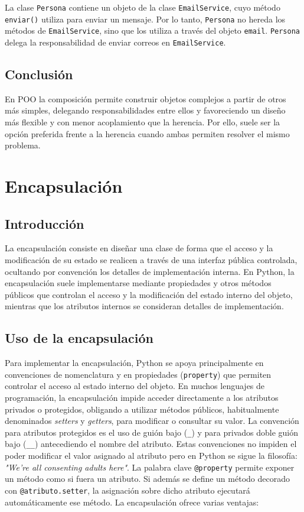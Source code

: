 \documentclass[11pt,a5paper,twoside]{book}
\begin{document}
La clase {\scriptsize \texttt{Persona}} contiene un objeto de la clase {\scriptsize \texttt{EmailService}}, cuyo método {\scriptsize \texttt{enviar()}} utiliza para enviar un mensaje. 
Por lo tanto, {\scriptsize \texttt{Persona}} no hereda los métodos de {\scriptsize \texttt{EmailService}}, sino que los utiliza a través del objeto {\scriptsize \texttt{email}}. {\scriptsize \texttt{Persona}} delega la responsabilidad de enviar correos en {\scriptsize \texttt{EmailService}}.
\subsection{Conclusión}
En POO la composición permite construir objetos complejos a partir de otros más simples, delegando responsabilidades entre ellos y favoreciendo un diseño más flexible y con menor acoplamiento que la herencia. Por ello, suele ser la opción preferida frente a la herencia cuando ambas permiten resolver el mismo problema.

\newpage

\section{Encapsulación}
\subsection{Introducción}
La encapsulación consiste en diseñar una clase de forma que el acceso y la modificación de su estado se realicen a través de una interfaz pública controlada, ocultando por convención los detalles de implementación interna.
En Python, la encapsulación suele implementarse mediante propiedades y otros métodos públicos que controlan el acceso y la modificación del estado interno del objeto, mientras que los atributos internos se consideran detalles de implementación.
\subsection{Uso de la encapsulación}
Para implementar la encapsulación, Python se apoya principalmente en convenciones de nomenclatura y en propiedades ({\scriptsize \texttt{property}}) que permiten controlar el acceso al estado interno del objeto. En muchos lenguajes de programación, la encapsulación impide acceder directamente a los atributos privados o protegidos, obligando a utilizar métodos públicos, habitualmente denominados \textit{setters} y \textit{getters}, para modificar o consultar su valor.
La convención para atributos protegidos es el uso de guión bajo ({\scriptsize \texttt{\_}}) y para privados doble guión bajo ({\scriptsize \texttt{\_\_}}) antecediendo el nombre del atributo. Estas convenciones no impiden el poder modificar el valor asignado al atributo pero en Python se sigue la filosofía: \textit{"We're all consenting adults here"}.
La palabra clave {\scriptsize \texttt{@property}} permite exponer un método como si fuera un atributo. Si además se define un método decorado con {\scriptsize \texttt{@atributo.setter}}, la asignación sobre dicho atributo ejecutará automáticamente ese método. 
La encapsulación ofrece varias ventajas:
\end{document}
